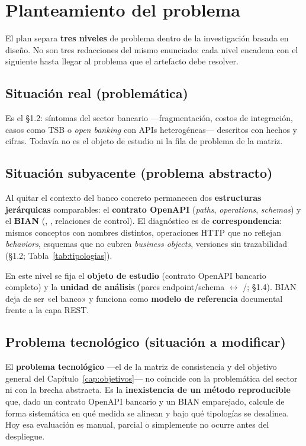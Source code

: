 \section{Planteamiento del problema}
\label{sec:planteamiento}

El plan separa \textbf{tres niveles} de problema dentro de la investigación basada en diseño. No
son tres redacciones del mismo enunciado: cada nivel encadena con el siguiente hasta llegar al
problema que el artefacto debe resolver.

\subsection{Situación real (problemática)}

Es el §1.2: síntomas del sector bancario ---fragmentación, costos de integración, casos como TSB o
\textit{open banking} con APIs heterogéneas--- descritos con hechos y cifras. Todavía no es el
objeto de estudio ni la fila de problema de la matriz.

\subsection{Situación subyacente (problema abstracto)}

Al quitar el contexto del banco concreto permanecen dos \textbf{estructuras jerárquicas}
comparables: el \textbf{contrato OpenAPI} (\textit{paths}, \textit{operations}, \textit{schemas}) y
el \textbf{\ServiceDomain{} BIAN} (\Behavior{}, \BusinessObject{}, relaciones de control). El
diagnóstico es de \textbf{correspondencia}: mismos conceptos con nombres distintos, operaciones HTTP
que no reflejan \textit{behaviors}, esquemas que no cubren \textit{business objects}, versiones sin
trazabilidad (§1.2; Tabla~\ref{tab:tipologias}).

En este nivel se fija el \textbf{objeto de estudio} (contrato OpenAPI bancario completo) y la
\textbf{unidad de análisis} (pares endpoint/\allowbreak schema $\leftrightarrow$
\Behavior{}/\BusinessObject{}; §1.4). BIAN deja de ser «el banco» y funciona como \textbf{modelo de
referencia} documental frente a la capa REST.

\subsection{Problema tecnológico (situación a modificar)}

El \textbf{problema tecnológico} ---el de la matriz de consistencia y del objetivo general del
Capítulo~\ref{cap:objetivos}--- no coincide con la problemática del sector ni con la brecha
abstracta. Es la \textbf{inexistencia de un método reproducible} que, dado un contrato OpenAPI
bancario y un \ServiceDomain{} BIAN emparejado, calcule de forma sistemática en qué medida se
alinean y bajo qué tipologías se desalinea. Hoy esa evaluación es manual, parcial o simplemente no
ocurre antes del despliegue.

